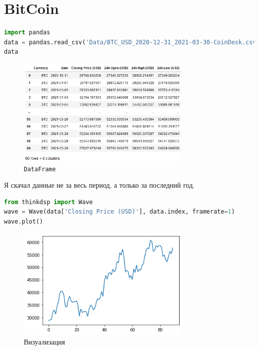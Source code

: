 \documentclass[a4paper,12pt]{report}
\begin{document}
    \chapter{BitCoin}
    
\begin{lstlisting}[language=Python,caption=Загрузка \texttt{DataFrame}]
import pandas
data = pandas.read_csv('Data/BTC_USD_2020-12-31_2021-03-30-CoinDesk.csv')
data
\end{lstlisting}

    \begin{figure}[H]
        \centering
        \includegraphics[width=0.75\textwidth]{ex3_data}
        \caption{\texttt{DataFrame}}
        \label{fig:ex3_data}
    \end{figure}
    
    Я скачал данные не за весь период, а только за последний год.
    
\begin{lstlisting}[language=Python,caption=Визуализация]
from thinkdsp import Wave
wave = Wave(data['Closing Price (USD)'], data.index, framerate=1)
wave.plot()
\end{lstlisting}

    \begin{figure}[H]
        \centering
        \includegraphics[width=0.75\textwidth]{ex3_wave}
        \caption{Визуализация}
        \label{fig:ex3_wave}
    \end{figure}
    
\end{document}
